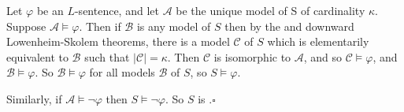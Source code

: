 \documentclass[12pt]{article}
\begin{document}
Let $\varphi$ be an $L$-sentence, and let $\mathcal{A}$ be the unique model of S of cardinality $\kappa$.  Suppose $\mathcal{A}\vDash\varphi$.  Then if $\mathcal{B}$ is any model of $S$ then by the  and downward Lowenheim-Skolem theorems, there is a model $\mathcal{C}$ of $S$ which is elementarily equivalent to $\mathcal{B}$ such that $|\mathcal{C}|=\kappa$.  Then $\mathcal{C}$ is isomorphic to $\mathcal{A}$, and so $\mathcal{C}\vDash\varphi$, and $\mathcal{B}\vDash\varphi$.  So $\mathcal{B}\vDash\varphi$ for all models $\mathcal{B}$ of $S$, so $S\vDash\varphi$.

Similarly, if $\mathcal{A}\vDash\lnot\varphi$ then $S\vDash\lnot\varphi$.  So $S$ is .$\square$
\end{document}
